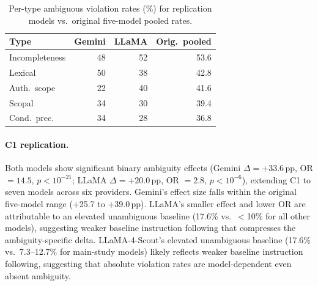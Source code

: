 \begin{table}[!ht]
\centering
\small
\caption{Replication results on two additional model families. C2 rank $\rho$ is computed against the original five-model pooled type ranking.}
\label{tab:expansion_overall}
\end{table}

\begin{table}[!ht]
\centering
\small
\caption{Per-type ambiguous violation rates (\%) for replication models vs.\ original five-model pooled rates.}
\label{tab:expansion_pertype}
\begin{tabular}{lrrr}
\toprule
Type & Gemini & LLaMA & Orig.\ pooled \\
\midrule
Incompleteness & 48 & 52 & 53.6 \\
Lexical & 50 & 38 & 42.8 \\
Auth.\ scope & 22 & 40 & 41.6 \\
Scopal & 34 & 30 & 39.4 \\
Cond.\ prec. & 34 & 28 & 36.8 \\
\bottomrule
\end{tabular}
\end{table}

\paragraph{C1 replication.} Both models show significant binary ambiguity effects (Gemini $\Delta = +33.6$\,pp, OR $= 14.5$, $p < 10^{-21}$; LLaMA $\Delta = +20.0$\,pp, OR $= 2.8$, $p < 10^{-6}$), extending C1 to seven models across six providers. Gemini's effect size falls within the original five-model range (+25.7 to +39.0\,pp). LLaMA's smaller effect and lower OR are attributable to an elevated unambiguous baseline (17.6\% vs.\ $<$10\% for all other models), suggesting weaker baseline instruction following that compresses the ambiguity-specific delta. LLaMA-4-Scout's elevated unambiguous baseline (17.6\% vs.\ 7.3--12.7\% for main-study models) likely reflects weaker baseline instruction following, suggesting that absolute violation rates are model-dependent even absent ambiguity.

